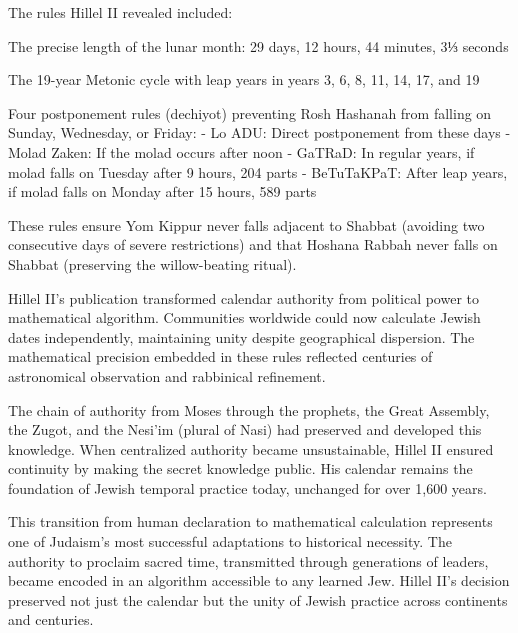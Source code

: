\begin{historical}
The rules Hillel II revealed included:

The precise length of the lunar month: 29 days, 12 hours, 44 minutes, 3⅓ seconds

The 19-year Metonic cycle with leap years in years 3, 6, 8, 11, 14, 17, and 19

Four postponement rules (dechiyot) preventing Rosh Hashanah from falling on Sunday, Wednesday, or Friday:
- Lo ADU: Direct postponement from these days
- Molad Zaken: If the molad occurs after noon
- GaTRaD: In regular years, if molad falls on Tuesday after 9 hours, 204 parts
- BeTuTaKPaT: After leap years, if molad falls on Monday after 15 hours, 589 parts

These rules ensure Yom Kippur never falls adjacent to Shabbat (avoiding two consecutive days of severe restrictions) and that Hoshana Rabbah never falls on Shabbat (preserving the willow-beating ritual).

Hillel II's publication transformed calendar authority from political power to mathematical algorithm. Communities worldwide could now calculate Jewish dates independently, maintaining unity despite geographical dispersion. The mathematical precision embedded in these rules reflected centuries of astronomical observation and rabbinical refinement.

The chain of authority from Moses through the prophets, the Great Assembly, the Zugot, and the Nesi'im (plural of Nasi) had preserved and developed this knowledge. When centralized authority became unsustainable, Hillel II ensured continuity by making the secret knowledge public. His calendar remains the foundation of Jewish temporal practice today, unchanged for over 1,600 years.

This transition from human declaration to mathematical calculation represents one of Judaism's most successful adaptations to historical necessity. The authority to proclaim sacred time, transmitted through generations of leaders, became encoded in an algorithm accessible to any learned Jew. Hillel II's decision preserved not just the calendar but the unity of Jewish practice across continents and centuries.
\end{historical}